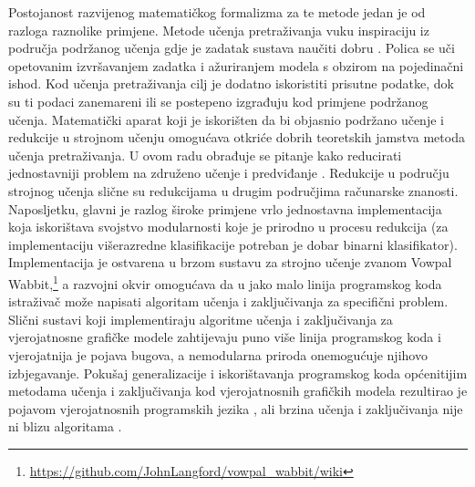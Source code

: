 Postojanost razvijenog matematičkog formalizma za te metode jedan je od razloga
raznolike primjene. Metode učenja pretraživanja vuku inspiraciju iz područja
podržanog učenja  gdje je zadatak sustava naučiti
dobru .
Polica se uči opetovanim izvršavanjem zadatka i ažuriranjem modela s obzirom na
pojedinačni ishod. Kod učenja pretraživanja cilj je dodatno iskoristiti prisutne
podatke, dok su ti podaci zanemareni ili se postepeno izgrađuju kod primjene
podržanog učenja. Matematički aparat koji je iskorišten da bi objasnio podržano
učenje i redukcije u strojnom učenju 
omogućava otkriće dobrih teoretskih jamstva metoda učenja pretraživanja. U ovom
radu obrađuje se pitanje kako reducirati jednostavniji problem na združeno
učenje i predviđanje . Redukcije u području
strojnog učenja slične su redukcijama u drugim područjima računarske znanosti.
Naposljetku, glavni je razlog široke primjene vrlo jednostavna implementacija
koja iskorištava svojstvo modularnosti koje je prirodno u procesu redukcija (za
implementaciju višerazredne klasifikacije potreban je dobar binarni
klasifikator). Implementacija je ostvarena u brzom sustavu za strojno učenje
zvanom Vowpal
Wabbit,\footnote{\url{https://github.com/JohnLangford/vowpal_wabbit/wiki}} a
\lts{} razvojni okvir omogućava da u jako malo linija programskog koda
istraživač može napisati algoritam učenja i zaključivanja za specifični problem.
Slični sustavi koji implementiraju algoritme učenja i zaključivanja za
vjerojatnosne grafičke modele zahtijevaju puno više linija programskog koda i
vjerojatnija je pojava bugova, a nemodularna priroda onemogućuje njihovo
izbjegavanje. Pokušaj generalizacije i iskorištavanja programskog koda
općenitijim metodama učenja i zaključivanja kod vjerojatnosnih grafičkih modela
rezultirao je pojavom vjerojatnosnih programskih jezika , ali brzina učenja i zaključivanja nije ni blizu
algoritama \lts{}.

